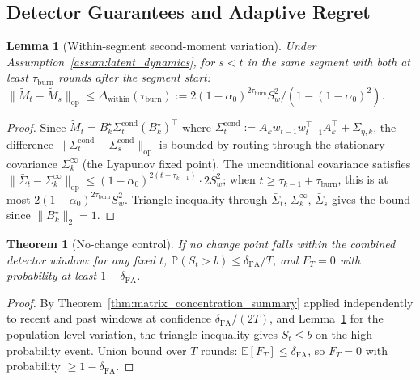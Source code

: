 \documentclass[11pt]{article}
\newcommand{\E}{\mathbb{E}}
\newcommand{\Prob}{\mathbb{P}}
\newcommand{\op}{\mathrm{op}}
\newtheorem{lemma}{Lemma}
\newtheorem{theorem}{Theorem}
\begin{document}
\subsection{Detector Guarantees and Adaptive Regret}
\label{sec:adaptive}

\begin{lemma}[Within-segment second-moment variation]
\label{lem:within_segment_variation}
Under Assumption~\ref{assum:latent_dynamics}, for $s<t$ in the same segment
with both at least $\tau_{\mathrm{burn}}$ rounds after the segment start:
$\|\widetilde{M}_t-\widetilde{M}_s\|_{\op}
\le\Delta_{\mathrm{within}}(\tau_{\mathrm{burn}})
:= 2(1{-}\alpha_0)^{2\tau_{\mathrm{burn}}}S_w^2/(1{-}(1{-}\alpha_0)^2)$.
\end{lemma}

\begin{proof}
Since $\widetilde{M}_t = B_k^\star\Sigma_t^{\mathrm{cond}}(B_k^\star)^\top$
where $\Sigma_t^{\mathrm{cond}}:=A_kw_{t-1}w_{t-1}^\top A_k^\top+\Sigma_{\eta,k}$,
the difference $\|\Sigma_t^{\mathrm{cond}}-\Sigma_s^{\mathrm{cond}}\|_{\op}$
is bounded by routing through the stationary covariance $\Sigma_k^\infty$
(the Lyapunov fixed point).
The unconditional covariance satisfies
$\|\bar\Sigma_t-\Sigma_k^\infty\|_{\op}
\le(1{-}\alpha_0)^{2(t-\tau_{k-1})}\cdot 2S_w^2$;
when $t\ge\tau_{k-1}+\tau_{\mathrm{burn}}$, this is at most
$2(1{-}\alpha_0)^{2\tau_{\mathrm{burn}}}S_w^2$.
Triangle inequality through $\bar\Sigma_t$, $\Sigma_k^\infty$, $\bar\Sigma_s$
gives the bound since $\|B_k^\star\|_2=1$.
\end{proof}

\begin{theorem}[No-change control]
\label{thm:no_change_control}
If no change point falls within the combined detector window: for any fixed $t$,
$\Prob(S_t>b)\le\delta_{\mathrm{FA}}/T$,
and $F_T=0$ with probability at least $1-\delta_{\mathrm{FA}}$.
\end{theorem}

\begin{proof}
By Theorem~\ref{thm:matrix_concentration_summary} applied independently to recent
and past windows at confidence $\delta_{\mathrm{FA}}/(2T)$, and
Lemma~\ref{lem:within_segment_variation} for the population-level variation,
the triangle inequality gives $S_t\le b$ on the high-probability event.
Union bound over $T$ rounds: $\E[F_T]\le\delta_{\mathrm{FA}}$, so
$F_T=0$ with probability $\ge 1-\delta_{\mathrm{FA}}$.
\end{proof}
\end{document}
